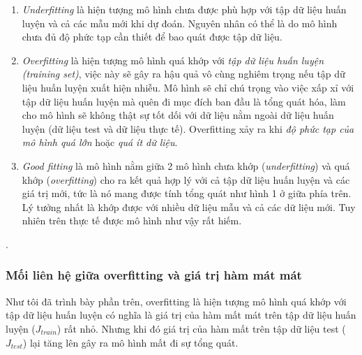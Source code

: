 \begin{enumerate}
\item
\textit{Underfitting} là hiện tượng mô hình chưa được phù hợp với tập dữ liệu huấn luyện và cả các mẫu mới khi dự đoán. Nguyên nhân có thể là do mô hình chưa đủ độ phức tạp cần thiết để bao quát được tập dữ liệu.
\item   \textit{Overfitting} là hiện tượng mô hình quá khớp với \textit{tập dữ liệu huấn luyện (training set)}, việc này sẽ gây ra hậu quả vô cùng nghiêm trọng nếu tập dữ liệu huấn luyện xuất hiện nhiễu. Mô hình sẽ chỉ chú trọng vào việc xấp xỉ với tập dữ liệu huấn luyện mà quên đi mục đích ban đầu là tổng quát hóa, làm cho mô hình sẽ không thật sự tốt dối với dữ liệu nằm ngoài dữ liệu huấn luyện (dữ liệu test và dữ liệu thực tế). Overfitting xảy ra khi \textit{độ phức tạp của mô hình quá lớn} hoặc \textit{quá ít dữ liệu}.
\item \textit{Good fitting} là mô hình nằm giữa 2 mô hình chưa khớp (\textit{underfitting}) và quá khớp (\textit{overfitting}) cho ra kết quả hợp lý với cả tập dữ liệu huấn luyện và các giá trị mới, tức là nó mang được tính tổng quát như hình 1 ở giữa phía trên. Lý tưởng nhất là khớp được với nhiều dữ liệu mẫu và cả các dữ liệu mới. Tuy nhiên trên thực tế được mô hình như vậy rất hiếm.
\end{enumerate}.
\subsubsection{Mối liên hệ giữa overfitting và giá trị hàm mát mát}
\hspace{5mm} Như tôi đã trình bày phần trên, overfitting là hiện tượng mô hình quá khớp với tập dữ liệu huấn luyện có nghĩa là giá trị của hàm mất mát trên tập dữ liệu huấn luyện (\textit{$J_{train}$}) rất nhỏ. Nhưng khi đó giá trị của hàm mất trên tập dữ liệu test (\textit{$J_{test}$}) lại tăng lên gây ra mô hình mất đi sự tổng quát. 

